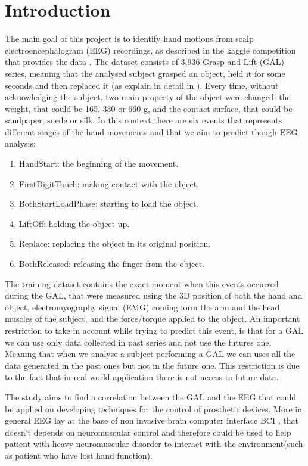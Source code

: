 \documentclass[final,leqno,onefignum,onetabnum]{siamltexmm}
\begin{document}
\section{Introduction}
The main goal of this project  is to identify hand motions from scalp electroencephalogram (EEG) recordings, as described in the kaggle competition that provides the data \cite{kaggle}. The dataset consists of 3,936 Grasp and Lift (GAL) series, meaning that the analysed subject grasped an object, held it for some seconds and then replaced it (as explain in detail in \cite{experiment}). Every time, without acknowledging the subject,  two main property  of the object were changed: the  weight, that could be 165, 330 or 660 g, and the contact surface, that could be sandpaper, suede or silk. In this context there are six events that represents different stages of the hand movements and that we aim to predict though EEG analysis: 
\begin{enumerate} 
\item HandStart: the beginning of the movement.
\item FirstDigitTouch: making contact with the object.  
\item BothStartLoadPhase: starting to load the object. 
\item LiftOff: holding the object up.
\item Replace: replacing the object in its original position.
\item BothReleased: releasing the finger from the object. 
\end{enumerate}
The training dataset contains the exact moment when this events occurred during the GAL, that were measured using the 3D position of both the hand and object, electromyography signal (EMG) coming form the arm and the head muscles of the subject, and the force/torque applied to the object. An important restriction to take in account while trying to predict this event, is that for a GAL we can use only data collected in past series and not use the futures one. Meaning that when we analyse a subject performing  a GAL we can uses all the data generated in the past ones but not in the future one. This restriction is due to the fact that in real world application there is not access to future data.


The study aims to find a correlation between the GAL and the EEG  that could be applied on developing techniques for the control of prosthetic devices. More in general EEG lay at the base of non invasive brain computer interface BCI \cite{BCI}, that doesn't depends on neuromuscular control and therefore could be used to help patient with heavy neuromuscular disorder to interact with the environment(such as patient who have lost hand function). 
\end{document}
